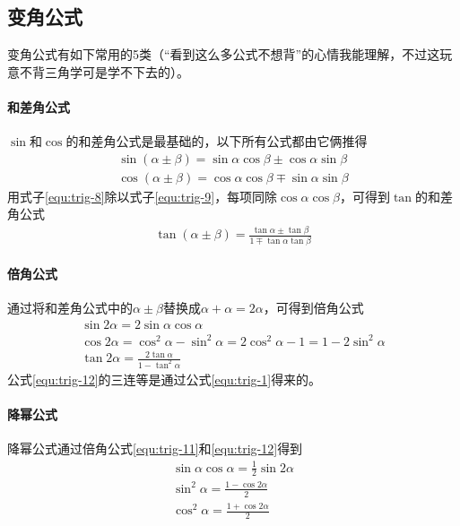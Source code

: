\subsection{变角公式}
变角公式有如下常用的5类（“看到这么多公式不想背”的心情我能理解，不过这玩意不背三角学可是学不下去的）。

\paragraph{和差角公式}
$\sin$和$\cos$的和差角公式是最基础的，以下所有公式都由它俩推得
\begin{gather}
	\sin(\alpha\pm\beta)=\sin\alpha\cos\beta\pm\cos\alpha\sin\beta \label{equ:trig-8} \\
	\cos(\alpha\pm\beta)=\cos\alpha\cos\beta\mp\sin\alpha\sin\beta \label{equ:trig-9}
\end{gather}
用式子\eqref{equ:trig-8}除以式子\eqref{equ:trig-9}，每项同除$\cos\alpha\cos\beta$，可得到$\tan$的和差角公式
\begin{gather}
	\tan(\alpha\pm\beta)=\frac{\tan\alpha\pm\tan\beta}{1\mp\tan\alpha\tan\beta} \label{equ:trig-10}
\end{gather}

\paragraph{倍角公式}
通过将和差角公式中的$\alpha\pm\beta$替换成$\alpha+\alpha=2\alpha$，可得到倍角公式
\begin{gather}
    \sin2\alpha=2\sin\alpha\cos\alpha \label{equ:trig-11} \\
    \cos2\alpha=\cos^2\alpha-\sin^2\alpha=2\cos^2\alpha-1=1-2\sin^2\alpha \label{equ:trig-12} \\
    \tan2\alpha=\frac{2\tan\alpha}{1-\tan^2\alpha} \label{equ:trig-13}
\end{gather}
公式\eqref{equ:trig-12}的三连等是通过公式\eqref{equ:trig-1}得来的。

\paragraph{降幂公式}
降幂公式通过倍角公式\eqref{equ:trig-11}和\eqref{equ:trig-12}得到
\begin{gather}
    \sin\alpha\cos\alpha=\frac{1}{2}\sin2\alpha \label{equ:trig-14} \\
    \sin^2\alpha=\frac{1-\cos2\alpha}{2} \label{equ:trig-15} \\
    \cos^2\alpha=\frac{1+\cos2\alpha}{2} \label{equ:trig-16}
\end{gather}

